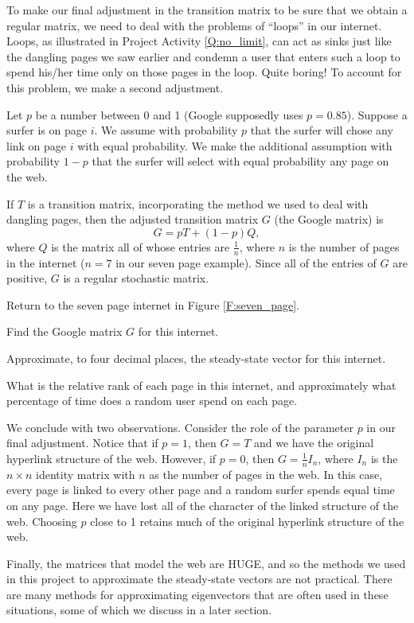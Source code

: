 To make our final adjustment in the transition matrix to be sure that we obtain a regular matrix, we need to deal with the problems of ``loops'' in our internet. Loops, as illustrated in Project Activity \ref{Q:no_limit}, can act as sinks just like the dangling pages we saw earlier and condemn a user that enters such a loop to spend his/her time only on those pages in the loop. Quite boring! To account for this problem, we make a second adjustment.

Let $p$ be a number between 0 and 1 (Google supposedly uses $p=0.85$). Suppose a surfer is on page $i$. We assume with probability $p$ that the surfer will chose any link on page $i$ with equal probability. We make the additional assumption with probability $1-p$ that the surfer will select with equal probability any page on the web.

If $T$ is a transition matrix, incorporating the method we used to deal with dangling pages, then the adjusted transition matrix $G$ (the Google matrix) is
\[G = pT + (1-p)Q,\]
where $Q$ is the matrix all of whose entries are $\frac{1}{n}$, where $n$ is the number of pages in the internet ($n=7$ in our seven page example). Since all of the entries of $G$ are positive, $G$ is a regular stochastic matrix.



\begin{pactivity} Return to the seven page internet in Figure \ref{F:seven_page}.
    \ba
    \item Find the Google matrix $G$ for this internet.

    \item Approximate, to four decimal places, the steady-state vector for this internet. 

    \item What is the relative rank of each page in this internet, and approximately what percentage of time does a random user spend on each page.
    
    \ea
\end{pactivity}


We conclude with two observations. Consider the role of the parameter $p$ in our final adjustment. Notice that if $p=1$, then $G = T$ and we have the original hyperlink structure of the web. However, if $p=0$, then $G = \frac{1}{n} I_n$, where $I_n$ is the $n \times n$ identity matrix with $n$ as the number of pages in the web. In this case, every page is linked to every other page and a random surfer spends equal time on any page. Here we have lost all of the character of the linked structure of the web. Choosing $p$ close to 1 retains much of the original hyperlink structure of the web.

Finally, the matrices that model the web are HUGE, and so the methods we used in this project to approximate the steady-state vectors are not practical. There are many methods for approximating eigenvectors that are often used in these situations, some of which we discuss in a later section.






